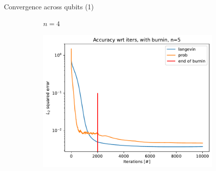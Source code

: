 \documentclass{beamer}
\begin{document}
\begin{frame}{Convergence across qubits (1)}
\begin{figure}[H]
\begin{subfigure}[b]{0.38\textwidth}
            \caption{$n=4$}
        
        \end{subfigure}
    
        \begin{subfigure}[b]{0.38\textwidth}
    
    
            \centering
            \includegraphics[width=\linewidth]{figures/experiments/baseline/diff_n_qubits/iters_acc_comp_iters_no_avg_n5-1.png}
        \end{subfigure}
            \quad
            \begin{minipage}[b]{.1\textwidth}
            \end{minipage}
            \hspace*{\fill}
    \end{figure}
\end{frame}
    
\end{document}
